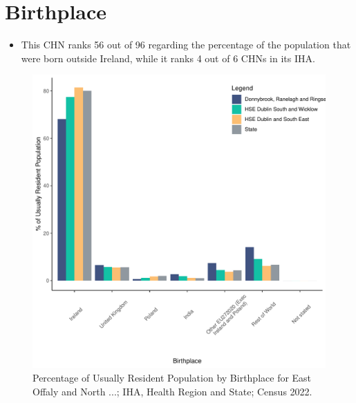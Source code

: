 \documentclass{article}
\begin{document}
\section{Birthplace}\label{sect:Birth}
\begin{itemize}
\item This CHN ranks  56 out of 96 regarding the percentage of the population that were born outside Ireland, while it ranks  4 out of 6 CHNs in its IHA.
\end{itemize}
\begin{figure}[H]
	\centering
	\includegraphics[width = 130mm]{../figures/BirthED.pdf}
	\caption{Percentage of Usually Resident Population by Birthplace for East Offaly and North ...; IHA, Health Region and State; Census 2022.}
	\label{fig:vbnv}
	\end{figure}
	
\end{document}
